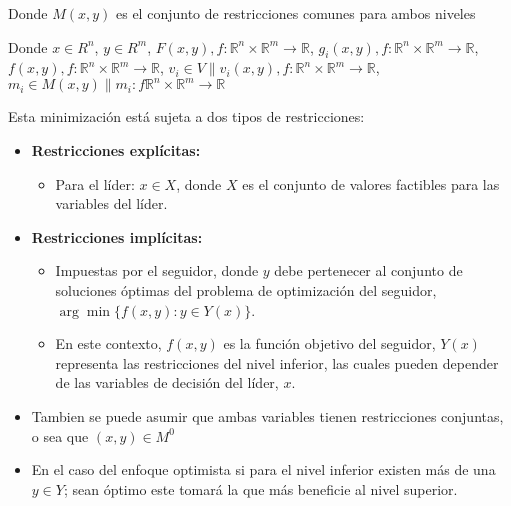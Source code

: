 Donde $M(x,y)$ es el conjunto de restricciones comunes para ambos niveles

Donde 
$x \in R^{n}$, $y \in R^{m}$, 
$F(x,y), f : \mathbb{R}^{n} \times \mathbb{R}^{m} \to \mathbb{R}$,
$g_i(x,y) , f : \mathbb{R}^{n} \times \mathbb{R}^{m} \to \mathbb{R} $, 
$f(x,y), f : \mathbb{R}^{n} \times \mathbb{R}^{m} \to \mathbb{R}$,
$v_i \in V \| v_i(x,y), f : \mathbb{R}^{n} \times \mathbb{R}^{m} \to \mathbb{R}$,
$m_i \in M(x,y) \| m_i : f \mathbb{R}^{n} \times \mathbb{R}^{m} \to \mathbb{R}$

Esta minimización está sujeta a dos tipos de restricciones: 
\begin{itemize}
    \item \textbf{Restricciones explícitas:}
    \begin{itemize}
        \item Para el líder: $x \in X$, donde $X$ es el conjunto de valores factibles para las variables del líder.
    \end{itemize}
    
    \item \textbf{Restricciones implícitas:}
    \begin{itemize}
        \item Impuestas por el seguidor, donde $y$ debe pertenecer al conjunto de soluciones óptimas del problema de optimización del seguidor, $\arg\min\{f(x, y) : y \in Y(x)\}$.
        \item En este contexto, $f(x, y)$ es la función objetivo del seguidor, $Y(x)$ representa las restricciones del nivel inferior, las cuales pueden depender de las variables de decisión del líder, $x$.
    \end{itemize}
	\item Tambien se puede asumir que ambas variables tienen restricciones conjuntas, o sea que $(x,y) \in M^0$
    \item En el caso del enfoque optimista si para el nivel inferior existen más de una $y \in Y$; sean óptimo este tomará la que más beneficie al nivel superior. 
\end{itemize}



